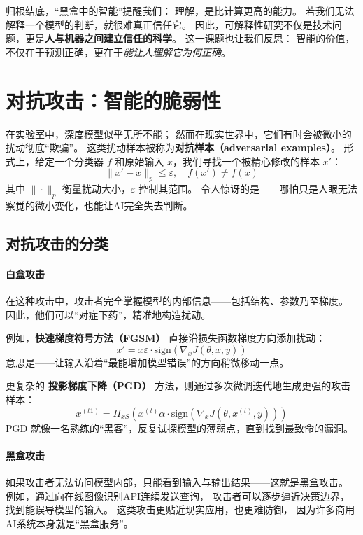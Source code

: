 归根结底，“黑盒中的智能”提醒我们：  
理解，是比计算更高的能力。  
若我们无法解释一个模型的判断，就很难真正信任它。  
因此，可解释性研究不仅是技术问题，更是\textbf{人与机器之间建立信任的科学}。  
这一课题也让我们反思：  
智能的价值，不仅在于预测正确，更在于\textit{能让人理解它为何正确}。

\section{对抗攻击：智能的脆弱性}

在实验室中，深度模型似乎无所不能；  
然而在现实世界中，它们有时会被微小的扰动彻底“欺骗”。  
这类扰动样本被称为\textbf{对抗样本（adversarial examples）}。  
形式上，给定一个分类器 $f$ 和原始输入 $x$，我们寻找一个被精心修改的样本 $x'$：  
$$\|x' - x\|_p \leq \varepsilon, \quad f(x') \neq f(x)$$  
其中 $\|\cdot\|_p$ 衡量扰动大小，$\varepsilon$ 控制其范围。  
令人惊讶的是——哪怕只是人眼无法察觉的微小变化，也能让AI完全失去判断。

\subsection{对抗攻击的分类}

\paragraph{白盒攻击}  
在这种攻击中，攻击者完全掌握模型的内部信息——包括结构、参数乃至梯度。  
因此，他们可以“对症下药”，精准地构造扰动。  

例如，\textbf{快速梯度符号方法（FGSM）} 直接沿损失函数梯度方向添加扰动：  
$$x' = x  \varepsilon \cdot \text{sign}(\nabla_x J(\theta, x, y))$$  
意思是——让输入沿着“最能增加模型错误”的方向稍微移动一点。  

更复杂的 \textbf{投影梯度下降（PGD）} 方法，则通过多次微调迭代地生成更强的攻击样本：  
$$x^{(t1)} = \Pi_{xS}(x^{(t)}  \alpha \cdot \text{sign}(\nabla_x J(\theta, x^{(t)}, y)))$$  
PGD 就像一名熟练的“黑客”，反复试探模型的薄弱点，直到找到最致命的漏洞。

\paragraph{黑盒攻击}  
如果攻击者无法访问模型内部，只能看到输入与输出结果——这就是黑盒攻击。  
例如，通过向在线图像识别API连续发送查询，  
攻击者可以逐步逼近决策边界，找到能误导模型的输入。  
这类攻击更贴近现实应用，也更难防御，  
因为许多商用AI系统本身就是“黑盒服务”。


